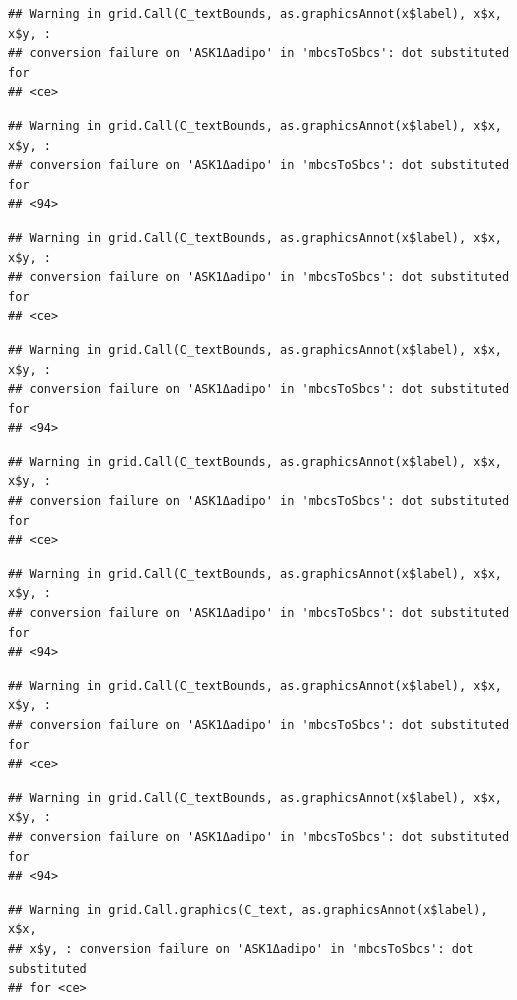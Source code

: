 \documentclass[]{book}
\begin{document}
\begin{verbatim}
## Warning in grid.Call(C_textBounds, as.graphicsAnnot(x$label), x$x, x$y, :
## conversion failure on 'ASK1Δadipo' in 'mbcsToSbcs': dot substituted for
## <ce>
\end{verbatim}

\begin{verbatim}
## Warning in grid.Call(C_textBounds, as.graphicsAnnot(x$label), x$x, x$y, :
## conversion failure on 'ASK1Δadipo' in 'mbcsToSbcs': dot substituted for
## <94>
\end{verbatim}

\begin{verbatim}
## Warning in grid.Call(C_textBounds, as.graphicsAnnot(x$label), x$x, x$y, :
## conversion failure on 'ASK1Δadipo' in 'mbcsToSbcs': dot substituted for
## <ce>
\end{verbatim}

\begin{verbatim}
## Warning in grid.Call(C_textBounds, as.graphicsAnnot(x$label), x$x, x$y, :
## conversion failure on 'ASK1Δadipo' in 'mbcsToSbcs': dot substituted for
## <94>
\end{verbatim}

\begin{verbatim}
## Warning in grid.Call(C_textBounds, as.graphicsAnnot(x$label), x$x, x$y, :
## conversion failure on 'ASK1Δadipo' in 'mbcsToSbcs': dot substituted for
## <ce>
\end{verbatim}

\begin{verbatim}
## Warning in grid.Call(C_textBounds, as.graphicsAnnot(x$label), x$x, x$y, :
## conversion failure on 'ASK1Δadipo' in 'mbcsToSbcs': dot substituted for
## <94>
\end{verbatim}

\begin{verbatim}
## Warning in grid.Call(C_textBounds, as.graphicsAnnot(x$label), x$x, x$y, :
## conversion failure on 'ASK1Δadipo' in 'mbcsToSbcs': dot substituted for
## <ce>
\end{verbatim}

\begin{verbatim}
## Warning in grid.Call(C_textBounds, as.graphicsAnnot(x$label), x$x, x$y, :
## conversion failure on 'ASK1Δadipo' in 'mbcsToSbcs': dot substituted for
## <94>
\end{verbatim}

\begin{verbatim}
## Warning in grid.Call.graphics(C_text, as.graphicsAnnot(x$label), x$x,
## x$y, : conversion failure on 'ASK1Δadipo' in 'mbcsToSbcs': dot substituted
## for <ce>
\end{verbatim}
\end{document}
